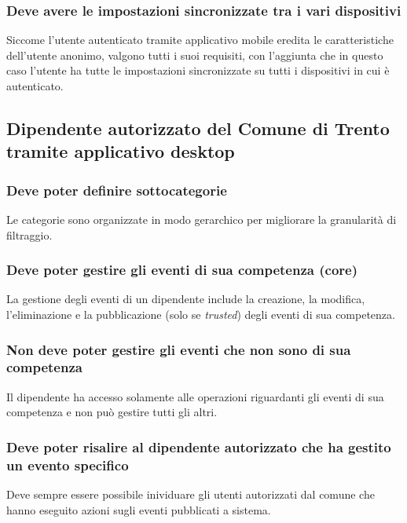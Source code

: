 \documentclass{article}
\begin{document}
\subsubsection{Deve avere le impostazioni sincronizzate tra i vari dispositivi}
\label{5.2.1}
Siccome l'utente autenticato tramite applicativo mobile eredita le caratteristiche dell'utente anonimo, valgono tutti i suoi requisiti, con l'aggiunta che in questo caso l'utente ha tutte le impostazioni sincronizzate su tutti i dispositivi in cui è autenticato.

\subsection{Dipendente autorizzato del Comune di Trento tramite applicativo desktop}

\subsubsection{Deve poter definire sottocategorie}
\label{5.3.1}
Le categorie sono organizzate in modo gerarchico per migliorare la granularità di filtraggio.

\subsubsection{Deve poter gestire gli eventi di sua competenza (core)}
\label{5.3.2}
La gestione degli eventi di un dipendente include la creazione, la modifica, l'eliminazione e la pubblicazione (solo se \textit{trusted}) degli eventi di sua competenza.

\subsubsection{Non deve poter gestire gli eventi che non sono di sua competenza}
\label{5.3.3}
Il dipendente ha accesso solamente alle operazioni riguardanti gli eventi di sua competenza e non può gestire tutti gli altri.

\subsubsection{Deve poter risalire al dipendente autorizzato che ha gestito un evento specifico}
\label{5.3.4}
Deve sempre essere possibile inividuare gli utenti autorizzati dal comune che hanno eseguito azioni sugli eventi pubblicati a sistema.
\end{document}
